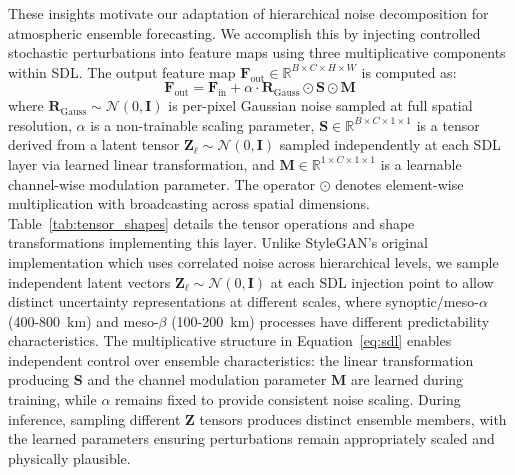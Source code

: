 \documentclass{agujournal2019}
\begin{document}
These insights motivate our adaptation of hierarchical noise decomposition for atmospheric ensemble forecasting. We accomplish this by injecting controlled stochastic perturbations into feature maps using three multiplicative components within SDL. The output feature map $\mathbf{F}_{\text{out}} \in \mathbb{R}^{B \times C \times H \times W}$ is computed as:
\begin{equation}
\mathbf{F}_{\text{out}} = \mathbf{F}_{\text{in}} + \alpha \cdot \mathbf{R}_{\text{Gauss}}  \odot \mathbf{S} \odot \mathbf{M}
\label{eq:sdl}
\end{equation}
where $\mathbf{R}_{\text{Gauss}} \sim \mathcal{N}(0, \mathbf{I})$ is per-pixel Gaussian noise sampled at full spatial resolution, $\alpha$ is a non-trainable scaling parameter, $\mathbf{S} \in \mathbb{R}^{B \times C \times 1 \times 1}$ is a tensor derived from a latent tensor $\mathbf{Z}_\ell \sim \mathcal{N}(0, \mathbf{I})$ sampled independently at each SDL layer via learned linear transformation, and $\mathbf{M} \in \mathbb{R}^{1 \times C \times 1 \times 1}$ is a learnable channel-wise modulation parameter. The operator $\odot$ denotes element-wise multiplication with broadcasting across spatial dimensions. Table~\ref{tab:tensor_shapes} details the tensor operations and shape transformations implementing this layer. Unlike StyleGAN's original implementation which uses correlated noise across hierarchical levels, we sample independent latent vectors $\mathbf{Z}_\ell \sim \mathcal{N}(0, \mathbf{I})$ at each SDL injection point to allow distinct uncertainty representations at different scales, where synoptic/meso-$\alpha$ (400-800~km) and meso-$\beta$ (100-200~km) processes have different predictability characteristics. The multiplicative structure in Equation~\ref{eq:sdl} enables independent control over ensemble characteristics: the linear transformation producing $\mathbf{S}$ and the channel modulation parameter $\mathbf{M}$ are learned during training, while $\alpha$ remains fixed to provide consistent noise scaling. During inference, sampling different $\mathbf{Z}$ tensors produces distinct ensemble members, with the learned parameters ensuring perturbations remain appropriately scaled and physically plausible.
\end{document}
